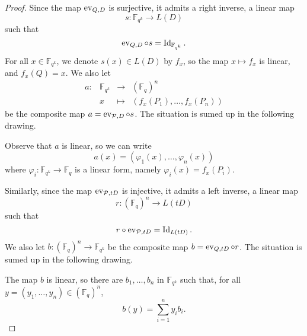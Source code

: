 \begin{proof}
  Since the map $\operatorname{ev}_{Q, D}$ is surjective, it admits a right inverse, \ie a linear
  map 
  \[
    s: \mathbb{F}_{q^k} \to L(D)
  \]
  such that
  \[
    \operatorname{ev}_{Q, D}\circ s = \operatorname{Id}_{\mathbb{F}_{q^k}}.
  \]
For all $x\in\mathbb{F}_{q^k}$, we denote $s(x)\in L(D)$ by $f_x$,
so the map $x\mapsto f_x$ is linear, and $f_x(Q)=x$. We
  also let
  \[
        \begin{array}{cccc}
          a: & \mathbb{F}_{q^k} & \to & (\mathbb{F}_{q})^n \\
          & x & \mapsto & (f_x(P_1), \dots, f_x(P_n))
\end{array}
  \]
  be the composite map $a = \operatorname{ev}_{\mathcal{P}, D}\circ s$. The situation is sumed up in the
  following drawing.
   \begin{center}
  \end{center}
Observe that $a$ is linear, so we can write
\[ a(x) = (\varphi_1(x), \dots, \varphi_n(x)) \]
where $\varphi_i:\mathbb{F}_{q^k}\to\mathbb{F}_{q}$ is a linear form, namely $\varphi_i(x)=f_x(P_i)$.

  Similarly, since the map $\operatorname{ev}_{\mathcal{P}, tD}$ is injective, it admits a left inverse, \ie a linear
  map 
  \[
    r: (\mathbb{F}_{q})^n \to L(tD)
  \]
  such that 
  \[r\circ\operatorname{ev}_{\mathcal{P}, tD} = \operatorname{Id}_{L(tD)}.
  \]
We also let $b: (\mathbb{F}_{q})^n \to \mathbb{F}_{q^k}$
  be the composite map $b = \operatorname{ev}_{Q, tD}\circ r$.   The situation is sumed up in the
  following drawing.
  \begin{center}
\end{center}
The map $b$ is linear, so there are $b_1, \dots, b_n$ in
  $\mathbb{F}_{q^k}$ such that, for all $y=(y_1, \dots, y_n)\in(\mathbb{F}_{q})^n$,
  \[
    b(y) = \sum_{i=1}^n y_i b_i.
  \]


\end{proof}
